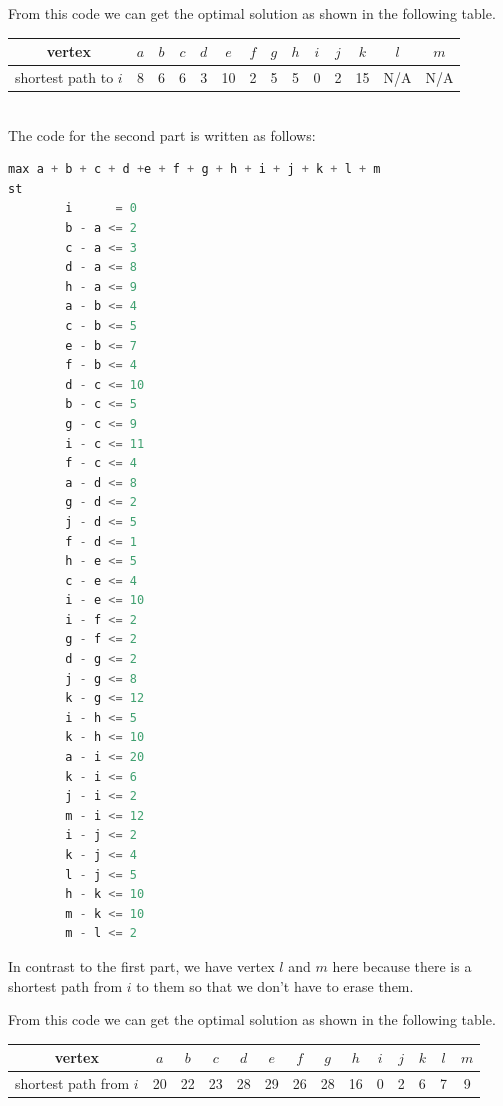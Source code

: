\documentclass[11pt]{scrreprt}
\begin{document}
From this code we can get the optimal solution as shown in the following table.\\
\begin{tabular}{|c|c|c|c|c|c|c|c|c|c|c|c|c|c|}
	\hline vertex & $a$   &  $b$ & $c$ & $d$ & $e$ & $f$ & $g$ & $h$ & $i$  & $j$ & $k$ & $l$ & $m$   \\
	\hline shortest path to $i$ & 8 & 6 & 6 & 3 & 10 & 2 & 5 & 5 & 0 & 2 & 15 & N/A & N/A \\
	\hline
\end{tabular} \\

The code for the second part is written as follows:
\begin{lstlisting}[language=c]
max a + b + c + d +e + f + g + h + i + j + k + l + m
st
        i      = 0 
        b - a <= 2
        c - a <= 3
        d - a <= 8
        h - a <= 9
        a - b <= 4
        c - b <= 5
        e - b <= 7
        f - b <= 4
        d - c <= 10
        b - c <= 5
        g - c <= 9
        i - c <= 11
        f - c <= 4
        a - d <= 8
        g - d <= 2
        j - d <= 5
        f - d <= 1
        h - e <= 5
        c - e <= 4
        i - e <= 10
        i - f <= 2
        g - f <= 2
        d - g <= 2
        j - g <= 8
        k - g <= 12
        i - h <= 5
        k - h <= 10
        a - i <= 20
        k - i <= 6
        j - i <= 2
        m - i <= 12
        i - j <= 2
        k - j <= 4
        l - j <= 5
        h - k <= 10
        m - k <= 10
        m - l <= 2
\end{lstlisting}

In contrast to the first part, we have vertex $l$ and $m$ here because there is a shortest path from $i$ to them so that we don't have to erase them.

From this code we can get the optimal solution as shown in the following table.\\
\begin{tabular}{|c|c|c|c|c|c|c|c|c|c|c|c|c|c|}
	\hline vertex & $a$   &  $b$ & $c$ & $d$ & $e$ & $f$ & $g$ & $h$ & $i$  & $j$ & $k$ & $l$ & $m$   \\
	\hline shortest path from $i$ & 20 & 22 & 23 & 28 & 29 & 26 & 28 & 16 & 0 & 2 & 6 & 7 & 9 \\
	\hline
\end{tabular} \\
\end{document}
